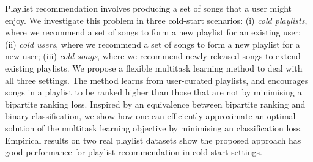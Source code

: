 
Playlist recommendation involves producing a set of songs that a user might enjoy.
We investigate this problem in three %
cold-start scenarios:
(i) \emph{cold playlists}, where we recommend a set of songs to form a new playlist for an existing user; %
(ii) \emph{cold users}, where we recommend a set of songs to form a new playlist for a new user; %
(iii) \emph{cold songs}, where we recommend newly released songs to extend existing playlists.
%
We propose a flexible multitask learning method to deal with all three settings.
The method learns from user-curated playlists,
and encourages songs in a playlist 
to be ranked higher than those that are not
by minimising a %
bipartite ranking loss.
Inspired by an equivalence between bipartite ranking and binary classification,
we show how one can efficiently approximate an optimal solution of the multitask learning objective by 
minimising an classification loss.
%
Empirical results on two real playlist datasets show the proposed approach has good performance 
for playlist recommendation in cold-start settings.
%
